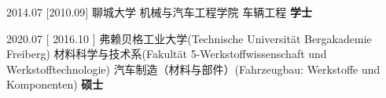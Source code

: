 \documentclass[zh]{resume}
\begin{document}
	\begin{spacing}{1.6}
		\begin{educations}
			
			\education%
			{{\large 2014.07}}%
			[{\large 2010.09}]%
			{{\large 聊城大学}}%
			{{\large 机械与汽车工程学院}}%
			{{\large 车辆工程}}%
			{{\large \textbf{学士}}}
			
			\separator{0.5ex}
			
			\education%
			{{\large 2020.07}}%
			[ {\large 2016.10} ]%
			{ {\large 弗赖贝格工业大学(Technische Universität Bergakademie Freiberg)} }%
			{ {\large 材料科学与技术系(Fakultät 5-Werkstoffwissenschaft und Werkstofftechnologie)} }%
			{ {\large 汽车制造（材料与部件）(Fahrzeugbau: Werkstoffe und Komponenten)} }%
			{{\large \textbf{硕士}}}
			
		\end{educations}
	\end{spacing}
\end{document}
